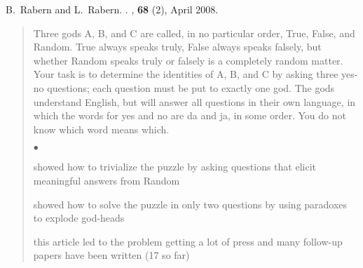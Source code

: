 \documentclass[10pt]{article}
\newcommand{\squishlist}{
   \begin{list}{$\bullet$}
    { \setlength{\itemsep}{0pt}    \setlength{\parsep}{0pt}
      \setlength{\topsep}{4.5pt}     \setlength{\partopsep}{0pt}
      \setlength{\leftmargin}{2em} \setlength{\labelwidth}{1.5em}
      \setlength{\labelsep}{0.5em} } }
\newcommand{\squishend}{
    \end{list}  }
\begin{document}
\vspace{0.5in}
{\large
B.~Rabern and L.~Rabern.
\newblock \href{http://brianrabern.net/sshlpe.pdf}{\color{blue}{A simple solution to the hardest logic puzzle ever}}. 
, \textbf{68} (2), April 2008.}

\begin{quote}
Three gods A, B, and C are called, in no particular order, True, False, and Random. 
True always speaks truly, False always speaks falsely, but whether Random speaks truly or falsely is a completely random matter. 
Your task is to determine the identities of A, B, and C by asking three yes-no questions; each question must be put to exactly one god. 
The gods understand English, but will answer all questions in their own language, in which the words for yes and no are da and ja, in some order. 
You do not know which word means which.
	  \squishlist
		\item showed how to trivialize the puzzle by asking questions that elicit meaningful answers from Random
		\item showed how to solve the puzzle in only two questions by using paradoxes to explode god-heads
		\item this article led to the problem getting a lot of press and many follow-up papers have been written (17 so far)
      \squishend
\end{quote}
\end{document}
